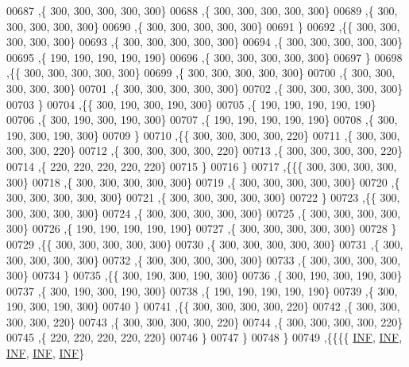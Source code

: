 \begin{DoxyCode}
00687    ,\{   300,   300,   300,   300,   300\}
00688    ,\{   300,   300,   300,   300,   300\}
00689    ,\{   300,   300,   300,   300,   300\}
00690    ,\{   300,   300,   300,   300,   300\}
00691    \}
00692   ,\{\{   300,   300,   300,   300,   300\}
00693    ,\{   300,   300,   300,   300,   300\}
00694    ,\{   300,   300,   300,   300,   300\}
00695    ,\{   190,   190,   190,   190,   190\}
00696    ,\{   300,   300,   300,   300,   300\}
00697    \}
00698   ,\{\{   300,   300,   300,   300,   300\}
00699    ,\{   300,   300,   300,   300,   300\}
00700    ,\{   300,   300,   300,   300,   300\}
00701    ,\{   300,   300,   300,   300,   300\}
00702    ,\{   300,   300,   300,   300,   300\}
00703    \}
00704   ,\{\{   300,   190,   300,   190,   300\}
00705    ,\{   190,   190,   190,   190,   190\}
00706    ,\{   300,   190,   300,   190,   300\}
00707    ,\{   190,   190,   190,   190,   190\}
00708    ,\{   300,   190,   300,   190,   300\}
00709    \}
00710   ,\{\{   300,   300,   300,   300,   220\}
00711    ,\{   300,   300,   300,   300,   220\}
00712    ,\{   300,   300,   300,   300,   220\}
00713    ,\{   300,   300,   300,   300,   220\}
00714    ,\{   220,   220,   220,   220,   220\}
00715    \}
00716   \}
00717  ,\{\{\{   300,   300,   300,   300,   300\}
00718    ,\{   300,   300,   300,   300,   300\}
00719    ,\{   300,   300,   300,   300,   300\}
00720    ,\{   300,   300,   300,   300,   300\}
00721    ,\{   300,   300,   300,   300,   300\}
00722    \}
00723   ,\{\{   300,   300,   300,   300,   300\}
00724    ,\{   300,   300,   300,   300,   300\}
00725    ,\{   300,   300,   300,   300,   300\}
00726    ,\{   190,   190,   190,   190,   190\}
00727    ,\{   300,   300,   300,   300,   300\}
00728    \}
00729   ,\{\{   300,   300,   300,   300,   300\}
00730    ,\{   300,   300,   300,   300,   300\}
00731    ,\{   300,   300,   300,   300,   300\}
00732    ,\{   300,   300,   300,   300,   300\}
00733    ,\{   300,   300,   300,   300,   300\}
00734    \}
00735   ,\{\{   300,   190,   300,   190,   300\}
00736    ,\{   300,   190,   300,   190,   300\}
00737    ,\{   300,   190,   300,   190,   300\}
00738    ,\{   190,   190,   190,   190,   190\}
00739    ,\{   300,   190,   300,   190,   300\}
00740    \}
00741   ,\{\{   300,   300,   300,   300,   220\}
00742    ,\{   300,   300,   300,   300,   220\}
00743    ,\{   300,   300,   300,   300,   220\}
00744    ,\{   300,   300,   300,   300,   220\}
00745    ,\{   220,   220,   220,   220,   220\}
00746    \}
00747   \}
00748  \}
00749 ,\{\{\{\{   \mbox{\hyperlink{1_88_84__epars_8h_a12c2040f25d8e3a7b9e1c2024c618cb6}{INF}},   \mbox{\hyperlink{1_88_84__epars_8h_a12c2040f25d8e3a7b9e1c2024c618cb6}{INF}},   \mbox{\hyperlink{1_88_84__epars_8h_a12c2040f25d8e3a7b9e1c2024c618cb6}{INF}},   \mbox{\hyperlink{1_88_84__epars_8h_a12c2040f25d8e3a7b9e1c2024c618cb6}{INF}},   \mbox{\hyperlink{1_88_84__epars_8h_a12c2040f25d8e3a7b9e1c2024c618cb6}{INF}}\}

\end{DoxyCode}
